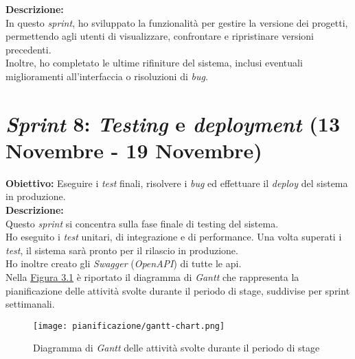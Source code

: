 \noindent \textbf{Descrizione:}\\
\noindent In questo \textit{sprint}, ho sviluppato la funzionalità per gestire la versione dei progetti, permettendo agli utenti di visualizzare, confrontare e ripristinare versioni precedenti.\\
Inoltre, ho completato le ultime rifiniture del sistema, inclusi eventuali miglioramenti all'interfaccia o risoluzioni di \textit{bug}.\\

\section*{\textit{Sprint} 8: \textit{Testing} e \textit{deployment} (13 Novembre - 19 Novembre)}
\textbf{Obiettivo:} Eseguire i \textit{test} finali, risolvere i \textit{bug} ed effettuare il \textit{deploy} del sistema in produzione.\\

\noindent \textbf{Descrizione:}\\
\noindent Questo \textit{sprint} si concentra sulla fase finale di testing del sistema.\\
Ho eseguito i \textit{test} unitari, di integrazione e di performance. Una volta superati i \textit{test}, il sistema sarà pronto per il rilascio in produzione. \\
Ho inoltre creato gli \textit{Swagger} (\textit{OpenAPI}) di tutte le \gls{api}.\\

\noindent Nella {\hyperref[fig:gantt-chart]{Figura 3.1}} è riportato il diagramma di \textit{Gantt} che rappresenta la pianificazione delle attività svolte durante il periodo di stage, suddivise per \gls{sprint} settimanali.\\

\begin{figure}[H]
    \centering
    \texttt{[image: pianificazione/gantt-chart.png]}
    \caption{Diagramma di \textit{Gantt} delle attività svolte durante il periodo di stage}
    \label{fig:gantt-chart}
\end{figure}
